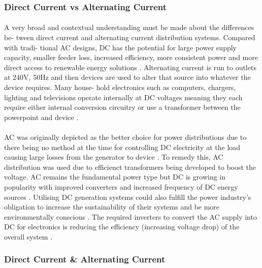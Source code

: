 \subsubsection{Direct Current vs Alternating Current}

\paragraph{}
A very broad and contextual understanding must be made about the differences be-
tween direct current and alternating current distribution systems. Compared with tradi-
tional AC designs, DC has the potential for large power supply capacity, smaller feeder
loss, increased efficiency, more consistent power and more direct access to renewable
energy solutions \cite{Liu2014}. Alternating current is run to outlets at 240V, 50Hz and then
devices are used to alter that source into whatever the device requires. Many house-
hold electronics such as computers, chargers, lighting and televisions operate internally
at DC voltages meaning they each require either internal conversion circuitry or use a
transformer between the powerpoint and device \cite{Paajanen2009}.

\paragraph{}
AC was originally depicted as the better choice for power distributions due to there
being no method at the time for controlling DC electricity at the load causing large
losses from the generator to device \cite{Starke2008b}. To remedy this, AC distribution was used
due to efficienct transformers being developed to boost the voltage. AC remains the
fundamental power type but DC is growing in popularity with improved converters and
increased frequency of DC energy sources \cite{Starke2008b}. Utilising DC generation systems could
also fulfill the power industry’s obligation to increase the sustainability of their systems
and be more environmentally conscious \cite{Starke2008a}. The required inverters to convert the AC
supply into DC for electronics is reducing the efficiency (increasing voltage drop) of the
overall system \cite{Starke2008b}. 

\subsubsection{Direct Current \& Alternating Current}

